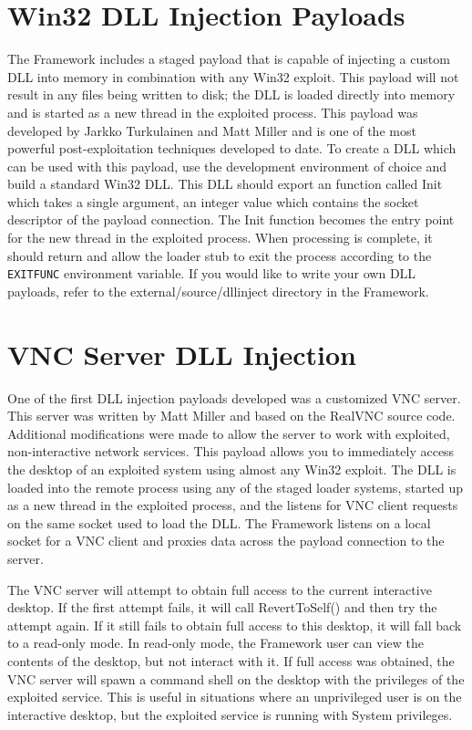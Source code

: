 \documentclass{report}
\begin{document}
\section{Win32 DLL Injection Payloads}
\par
The Framework includes a staged payload that is
capable of injecting a custom DLL into memory in combination with any Win32
exploit. This payload will not result in any files being written to disk; the
DLL is loaded directly into memory and is started as a new thread in the
exploited process. This payload was developed by Jarkko Turkulainen and Matt
Miller and is one of the most powerful post-exploitation techniques developed
to date. To create a DLL which can be used with this payload, use the
development environment of choice and build a standard Win32 DLL. This DLL
should export an function called Init which takes a single argument, an
integer value which contains the socket descriptor of the payload connection.
The Init function becomes the entry point for the new thread in the exploited
process. When processing is complete, it should return and allow the loader
stub to exit the process according to the \texttt{EXITFUNC} environment
variable. If you would like to write your own DLL payloads, refer to the
external/source/dllinject directory in the Framework. 

\section{VNC Server DLL Injection}
\par
One of the first DLL injection payloads developed was a customized VNC server.
This server was written by Matt Miller and based on the RealVNC source code.
Additional modifications were made to allow the server to work with exploited,
non-interactive network services. This payload allows you to immediately access
the desktop of an exploited system using almost any Win32 exploit. The DLL is
loaded into the remote process using any of the staged loader systems, started
up as a new thread in the exploited process, and the listens for VNC client
requests on the same socket used to load the DLL. The Framework listens
on a local socket for a VNC client and proxies data across the payload
connection to the server.  

\par
The VNC server will attempt to obtain full access to the current interactive
desktop. If the first attempt fails, it will call RevertToSelf() and then try
the attempt again. If it still fails to obtain full access to this desktop, it
will fall back to a read-only mode. In read-only mode, the Framework user can
view the contents of the desktop, but not interact with it. If full access was
obtained, the VNC server will spawn a command shell on the desktop with the
privileges of the exploited service. This is useful in situations where an
unprivileged user is on the interactive desktop, but the exploited service is
running with System privileges.  
\end{document}
